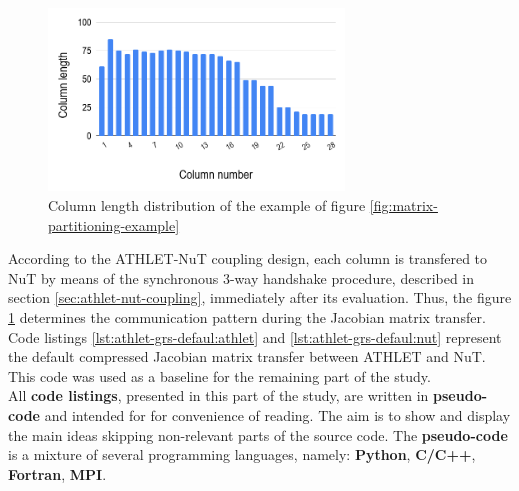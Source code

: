 \begin{figure}[htpb]
  \centering
  \includegraphics[width=0.7\textwidth]{figures/matrix-compression-2.png}
  \caption{Column length distribution of the example of figure \ref{fig:matrix-partitioning-example}} \label{fig:matrix-column-distribution}
\end{figure}


According to the ATHLET-NuT coupling design, each column is transfered to NuT by means of the synchronous 3-way handshake procedure, described in section \ref{sec:athlet-nut-coupling}, immediately after its evaluation. Thus, the figure \ref{fig:matrix-column-distribution} determines the communication pattern during the Jacobian matrix transfer.\\


Code listings \ref{lst:athlet-grs-defaul:athlet} and \ref{lst:athlet-grs-defaul:nut} represent the default compressed Jacobian matrix transfer between ATHLET and NuT. This code was used as a baseline for the remaining part of the study.\\


All \textbf{code listings}, presented in this part of the study, are written in \textbf{pseudo-code} and intended for for convenience of reading. The aim is to show and display the main ideas skipping non-relevant parts of the source code. The \textbf{pseudo-code} is a mixture of several programming languages, namely: \textbf{Python}, \textbf{C/C++}, \textbf{Fortran}, \textbf{MPI}.\\


